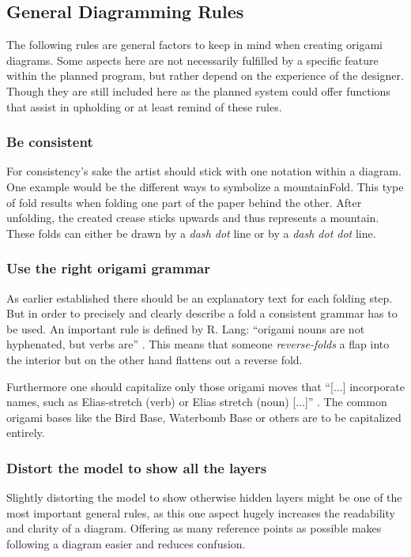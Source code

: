 \newpage
\subsection{General Diagramming Rules}
\label{sec:generalRules}

The following rules are general factors to keep in mind when creating origami diagrams. Some aspects here are not necessarily fulfilled by a specific feature within the planned program, but rather depend on the experience of the designer. Though they are still included here as the planned system could offer functions that assist in upholding or at least remind of these rules.

\subsubsection*{Be consistent}
For consistency's sake the artist should stick with one notation within a diagram. One example would be the different ways to symbolize a \gls{mountainFold}. This type of fold results when folding one part of the paper behind the other. After unfolding, the created crease sticks upwards and thus represents a mountain. These folds can either be drawn by a \emph{dash dot} line or by a \emph{dash dot dot} line.

\subsubsection*{Use the right origami grammar}
As earlier established there should be an explanatory text for each folding step. But in order to precisely and clearly describe a fold a consistent grammar has to be used. An important rule is defined by R. Lang: \enquote{origami nouns are not hyphenated, but verbs are} \cite{Lang}. This means that someone \emph{reverse-folds} a flap into the interior but on the other hand flattens out a reverse fold.

Furthermore one should capitalize only those origami moves that \enquote{[...] incorporate names, such as Elias-stretch (verb) or Elias stretch (noun) [...]} \cite{Lang}. The common origami bases like the Bird Base, Waterbomb Base or others are to be capitalized entirely.

\subsubsection*{Distort the model to show all the layers}
Slightly distorting the model to show otherwise hidden layers might be one of the most important general rules, as this one aspect hugely increases the readability and clarity of a diagram. Offering as many reference points as possible makes following a diagram easier and reduces confusion.

